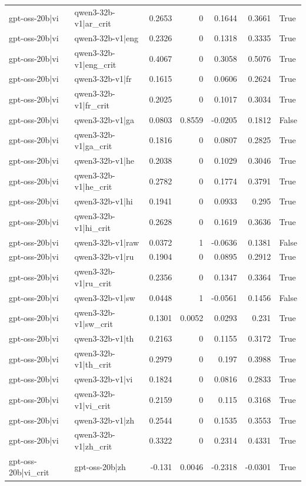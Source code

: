 \begin{table}
\begin{tabular}{l l r r r r l}
gpt-oss-20b|vi & qwen3-32b-v1|ar_crit & 0.2653 & 0 & 0.1644 & 0.3661 & True \\
gpt-oss-20b|vi & qwen3-32b-v1|eng & 0.2326 & 0 & 0.1318 & 0.3335 & True \\
gpt-oss-20b|vi & qwen3-32b-v1|eng_crit & 0.4067 & 0 & 0.3058 & 0.5076 & True \\
gpt-oss-20b|vi & qwen3-32b-v1|fr & 0.1615 & 0 & 0.0606 & 0.2624 & True \\
gpt-oss-20b|vi & qwen3-32b-v1|fr_crit & 0.2025 & 0 & 0.1017 & 0.3034 & True \\
gpt-oss-20b|vi & qwen3-32b-v1|ga & 0.0803 & 0.8559 & -0.0205 & 0.1812 & False \\
gpt-oss-20b|vi & qwen3-32b-v1|ga_crit & 0.1816 & 0 & 0.0807 & 0.2825 & True \\
gpt-oss-20b|vi & qwen3-32b-v1|he & 0.2038 & 0 & 0.1029 & 0.3046 & True \\
gpt-oss-20b|vi & qwen3-32b-v1|he_crit & 0.2782 & 0 & 0.1774 & 0.3791 & True \\
gpt-oss-20b|vi & qwen3-32b-v1|hi & 0.1941 & 0 & 0.0933 & 0.295 & True \\
gpt-oss-20b|vi & qwen3-32b-v1|hi_crit & 0.2628 & 0 & 0.1619 & 0.3636 & True \\
gpt-oss-20b|vi & qwen3-32b-v1|raw & 0.0372 & 1 & -0.0636 & 0.1381 & False \\
gpt-oss-20b|vi & qwen3-32b-v1|ru & 0.1904 & 0 & 0.0895 & 0.2912 & True \\
gpt-oss-20b|vi & qwen3-32b-v1|ru_crit & 0.2356 & 0 & 0.1347 & 0.3364 & True \\
gpt-oss-20b|vi & qwen3-32b-v1|sw & 0.0448 & 1 & -0.0561 & 0.1456 & False \\
gpt-oss-20b|vi & qwen3-32b-v1|sw_crit & 0.1301 & 0.0052 & 0.0293 & 0.231 & True \\
gpt-oss-20b|vi & qwen3-32b-v1|th & 0.2163 & 0 & 0.1155 & 0.3172 & True \\
gpt-oss-20b|vi & qwen3-32b-v1|th_crit & 0.2979 & 0 & 0.197 & 0.3988 & True \\
gpt-oss-20b|vi & qwen3-32b-v1|vi & 0.1824 & 0 & 0.0816 & 0.2833 & True \\
gpt-oss-20b|vi & qwen3-32b-v1|vi_crit & 0.2159 & 0 & 0.115 & 0.3168 & True \\
gpt-oss-20b|vi & qwen3-32b-v1|zh & 0.2544 & 0 & 0.1535 & 0.3553 & True \\
gpt-oss-20b|vi & qwen3-32b-v1|zh_crit & 0.3322 & 0 & 0.2314 & 0.4331 & True \\
gpt-oss-20b|vi_crit & gpt-oss-20b|zh & -0.131 & 0.0046 & -0.2318 & -0.0301 & True \\

\end{tabular}
\end{table}
